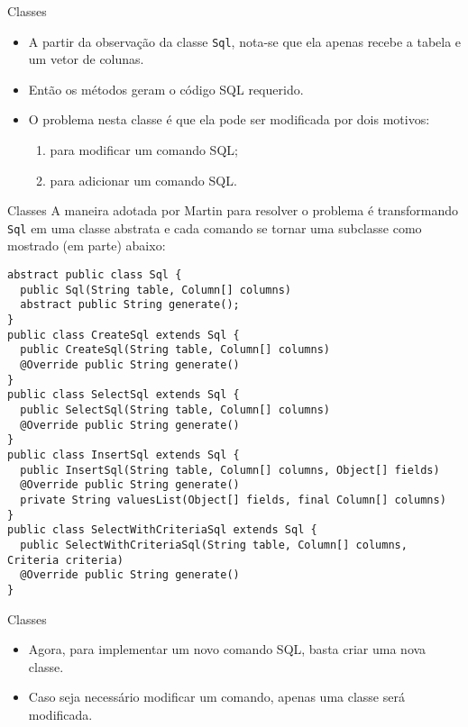 \documentclass[11pt]{beamer}
\begin{document}
  \begin{frame}[fragile]{Classes}
    \begin{itemize}
      \item A partir da observação da classe \verb|Sql|, nota-se que ela apenas recebe a tabela e um vetor de colunas.
      \item Então os métodos geram o código SQL requerido.
      \item O problema nesta classe é que ela pode ser modificada por dois motivos:
      \begin{enumerate}
        \item para modificar um comando SQL;
        \item para adicionar um comando SQL.
      \end{enumerate}
    \end{itemize}
  \end{frame}

  \begin{frame}[fragile]{Classes}
    A maneira adotada por Martin para resolver o problema é transformando \verb|Sql| em uma classe abstrata e cada comando se tornar uma subclasse como mostrado (em parte) abaixo:
    \begin{lstlisting}[basicstyle=\tiny]
abstract public class Sql {
  public Sql(String table, Column[] columns)
  abstract public String generate();
}
public class CreateSql extends Sql {
  public CreateSql(String table, Column[] columns)
  @Override public String generate()
}
public class SelectSql extends Sql {
  public SelectSql(String table, Column[] columns)
  @Override public String generate()
}
public class InsertSql extends Sql {
  public InsertSql(String table, Column[] columns, Object[] fields)
  @Override public String generate()
  private String valuesList(Object[] fields, final Column[] columns)
}
public class SelectWithCriteriaSql extends Sql {
  public SelectWithCriteriaSql(String table, Column[] columns, Criteria criteria)
  @Override public String generate()
}
    \end{lstlisting}
  \end{frame}

  \begin{frame}[fragile]{Classes}
    \begin{itemize}
      \item Agora, para implementar um novo comando SQL, basta criar uma nova classe.
      \item Caso seja necessário modificar um comando, apenas uma classe será modificada.
    \end{itemize}

  \end{frame}
\end{document}
